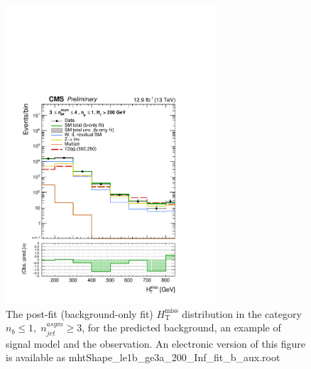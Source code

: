 \begin{figure}[tbhp]
    \caption{ 
    The post-fit (background-only fit) $H_{\mathrm{T}}^{\mathrm{miss}}$ distribution in the category $n_{b}\leq 1, \; n_{jet}^{asym} \geq 3$, 
    for the predicted background, an example of signal model and the observation.
    An electronic version of this figure is available as mhtShape\_le1b\_ge3a\_200\_Inf\_fit\_b\_aux.root
    \label{fig:mhtShape_le1b_ge3a_fit_b} }
  \begin{center}
  \includegraphics[width=0.7\textwidth]{mhtShape_le1b_ge3a_200_Inf_fit_b_aux}
  \end{center}
\end{figure}


